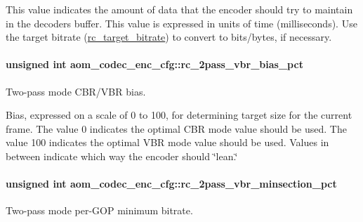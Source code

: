 This value indicates the amount of data that the encoder should try to maintain in the decoder\textquotesingle{}s buffer. This value is expressed in units of time (milliseconds). Use the target bitrate (\hyperlink{structaom__codec__enc__cfg_ab21539da477dba7506d90353c27d218b}{rc\+\_\+target\+\_\+bitrate}) to convert to bits/bytes, if necessary. 
\paragraph[{\texorpdfstring{rc\+\_\+2pass\+\_\+vbr\+\_\+bias\+\_\+pct}{rc_2pass_vbr_bias_pct}}]{\setlength{\rightskip}{0pt plus 5cm}unsigned int aom\+\_\+codec\+\_\+enc\+\_\+cfg\+::rc\+\_\+2pass\+\_\+vbr\+\_\+bias\+\_\+pct}\hypertarget{structaom__codec__enc__cfg_a630b9cb2fa79022a7b63cb0bed7e5fcb}{}\label{structaom__codec__enc__cfg_a630b9cb2fa79022a7b63cb0bed7e5fcb}


Two-\/pass mode C\+B\+R/\+V\+BR bias. 

Bias, expressed on a scale of 0 to 100, for determining target size for the current frame. The value 0 indicates the optimal C\+BR mode value should be used. The value 100 indicates the optimal V\+BR mode value should be used. Values in between indicate which way the encoder should \char`\"{}lean.\char`\"{} 
\paragraph[{\texorpdfstring{rc\+\_\+2pass\+\_\+vbr\+\_\+minsection\+\_\+pct}{rc_2pass_vbr_minsection_pct}}]{\setlength{\rightskip}{0pt plus 5cm}unsigned int aom\+\_\+codec\+\_\+enc\+\_\+cfg\+::rc\+\_\+2pass\+\_\+vbr\+\_\+minsection\+\_\+pct}\hypertarget{structaom__codec__enc__cfg_a623802304a377237ec6df7ae31984655}{}\label{structaom__codec__enc__cfg_a623802304a377237ec6df7ae31984655}


Two-\/pass mode per-\/\+G\+OP minimum bitrate. 


